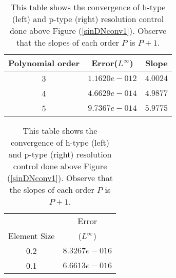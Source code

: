 \begin{table}[h]
\centering \caption{\label{hconv2t1} This table shows the
convergence of h-type (left) and p-type (right) resolution control
done above Figure (\ref{sinDNconv1}). Observe that the slopes of
each order $P$ is $P+1$. }
\begin{tabular}{|c|c|c|} \hline
    Polynomial order&Error($L^{\infty}$)&Slope   \\ \hline \hline
    3&$1.1620e-012$ &$4.0024$ \\ \hline
    4&$4.6629e-014$ &$4.9877$ \\ \hline
    5&$9.7367e-014$ &$5.9775$ \\ \hline
\end{tabular}
\hspace{.5in}
\begin{tabular}{|c|c|} \hline
    &\multicolumn{1}{|c|}{Error}\\
    \raisebox{0.5\baselineskip}%
    {Element Size}&($L^{\infty}$) \\ \hline \hline
    0.2&$8.3267e-016$  \\ \hline
    0.1&$6.6613e-016$  \\ \hline
\end{tabular}

\end{table}
